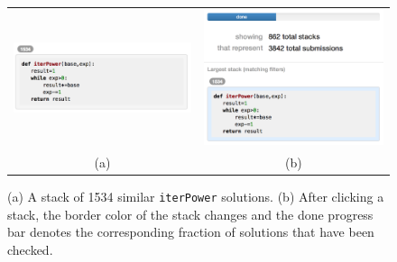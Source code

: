 \documentclass[12pt,twoside]{mitthesis}
\newcommand \codevar[1]{\texttt{#1}}
\begin{document}
\begin{figure}[htpb]
\begin{tabular}{c | c}
\begin{minipage}{.5\linewidth}
\centering
\includegraphics[width=0.95\linewidth]{Body/figures/overcode/stackScreenShot.png}
\end{minipage}
&
\begin{minipage}{.5\linewidth}
\centering
\includegraphics[width=0.95\linewidth]{Body/figures/overcode/checkDone.png}
\end{minipage}
\\
(a) & (b)
\end{tabular}
\caption{(a) A stack of 1534 similar \codevar{iterPower} solutions. (b) After clicking a stack, the border color of the stack changes and the done progress bar denotes the corresponding fraction of solutions that have been checked.}
\label{stacks}
\end{figure}
\end{document}

